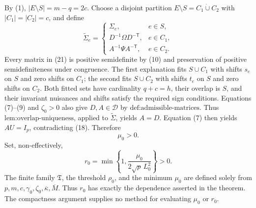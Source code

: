 By (1), \(|E\setminus S|=m-q=2c\). Choose a disjoint partition \(E\setminus S=C_1\mathbin{\dot\cup}C_2\) with \(|C_1|=|C_2|=c\), and define
\[
\widetilde\Sigma_e=
\begin{cases}
\Sigma_e,&e\in S,\\
D^{-1}\Omega D^{-\mathsf T},&e\in C_1,\\
A^{-1}\Psi A^{-\mathsf T},&e\in C_2.
\end{cases}
\tag{21}
\]
Every matrix in (21) is positive semidefinite by (10) and preservation of positive semidefiniteness under congruence. The first explanation fits \(S\cup C_1\) with shifts \(s_e\) on \(S\) and zero shifts on \(C_1\); the second fits \(S\cup C_2\) with shifts \(t_e\) on \(S\) and zero shifts on \(C_2\). Both fitted sets have cardinality \(q+c=h\), their overlap is \(S\), and their invariant nuisances and shifts satisfy the required sign conditions. Equations (7)--(9) and \(\zeta_0>0\) also give \(D,A\in\mathcal D\) by \(\text{def:admissible-matrices}\). Thus \(\text{lem:overlap-uniqueness}\), applied to \(\widetilde\Sigma\), yields \(A=D\). Equation (7) then yields \(AU=I_p\), contradicting (18). Therefore
\[
\mu_0>0.
\tag{22}
\]
Set, non-effectively,
\[
r_0=\min\left\{1,\frac{\mu_0}{2\sqrt p\,L_0^2}\right\}>0.
\tag{23}
\]
The finite family \(\mathfrak T\), the threshold \(\rho_0\), and the minimum \(\mu_0\) are defined solely from \(p,m,c,\gamma_0,\zeta_0,\overline\kappa,\overline M\). Thus \(r_0\) has exactly the dependence asserted in the theorem. The compactness argument supplies no method for evaluating \(\mu_0\) or \(r_0\).

